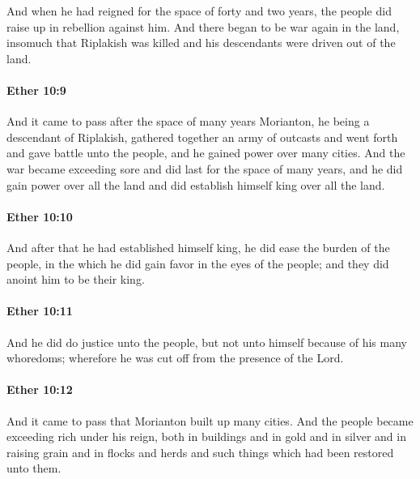 			And when he had reigned for the space of forty and two years,
			the people did raise up in rebellion against him.
			And there began to be war again in the land,
			insomuch that Riplakish was killed
			and his descendants were driven out of the land.

		\paragraph{Ether 10:9} %
			\label{ETHER-10-9}

			And it came to pass after the space of many years
			Morianton, he being a descendant of Riplakish,
			gathered together an army of outcasts
			and went forth and gave battle unto the people,
			and he gained power over many cities.
			And the war became exceeding sore and did last for the space of many years,
			and he did gain power over all the land
			and did establish himself king over all the land.

		\paragraph{Ether 10:10} %
			\label{ETHER-10-10}

			And after that he had established himself king,
			he did ease the burden of the people,
			in the which he did gain favor in the eyes of the people;
			and they did anoint him to be their king.

		\paragraph{Ether 10:11} %
			\label{ETHER-10-11}

			And he did do justice unto the people,
			but not unto himself because of his many whoredoms;
			wherefore he was cut off from the presence of the Lord.

		\paragraph{Ether 10:12} %
			\label{ETHER-10-12}

			And it came to pass that Morianton built up many cities.
			And the people became exceeding rich under his reign,
			both in buildings and in gold and in silver
			and in raising grain and in flocks and herds
			and such things which had been restored unto them.

